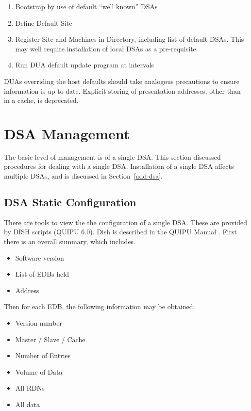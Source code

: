 \begin {enumerate}
\item Bootstrap  by use of default ``well known'' DSAs
\item Define Default Site 
\item Register Site and Machines in Directory, including list of default
DSAs.   This may well require installation of local DSAs as a pre-requisite.
\item Run DUA default update program at intervals
\end {enumerate}


DUAs overriding the host defaults should take analogous precautions to
ensure information is up to date.  Explicit storing of presentation
addresses, other than in a cache, is deprecated.

\section {DSA Management}

The basic level of management is of a single DSA.  This section discussed
procedures for dealing with a single DSA.  Installation of a single DSA
affects multiple DSAs, and is discussed in Section~\ref{add-dsa}.

\subsection {DSA Static Configuration}

There are tools to view the the configuration of a single DSA.  These are
provided by DISH scripts (QUIPU 6.0).
Dish is described in the QUIPU Manual \cite{QUIPU.Manual}.
First there is an overall summary, which includes.

\begin {itemize}
\item Software version
\item List of EDBs held 
\item Address
\end {itemize}

Then for each EDB, the following information may be obtained:

\begin {itemize}
\item Version number
\item Master / Slave / Cache
\item Number of Entries
\item Volume of Data
\item All RDNs 
\item All data
\end {itemize}

